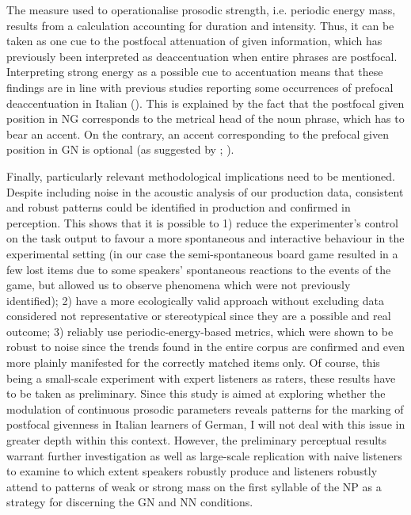 The measure used to operationalise prosodic strength, i.e. periodic energy mass, results from a calculation accounting for duration and intensity. Thus, it can be taken as one cue to the postfocal attenuation of given information, which has previously been interpreted as deaccentuation when entire phrases are postfocal. Interpreting strong energy as a possible cue to accentuation means that these findings are in line with previous studies reporting some occurrences of prefocal deaccentuation in Italian (\citealt{AvesaniEtAl2015}). This is explained by the fact that the postfocal given position in NG corresponds to the metrical head of the noun phrase, which has to bear an accent. On the contrary, an accent corresponding to the prefocal given position in GN is optional (as suggested by \citealt{AvesaniEtAl2015}; \citealt{BocciAvesani2011}).

Finally, particularly relevant methodological implications need to be mentioned. Despite including noise in the acoustic analysis of our production data, consistent and robust patterns could be identified in production and confirmed in perception. This shows that it is possible to 1) reduce the experimenter’s control on the task output to favour a more spontaneous and interactive behaviour in the experimental setting (in our case the semi-spontaneous board game resulted in a few lost items due to some speakers’ spontaneous reactions to the events of the game, but allowed us to observe phenomena which were not previously identified); 2) have a more ecologically valid approach without excluding data considered not representative or stereotypical since they are a possible and real outcome; 3) reliably use periodic-energy-based metrics, which were shown to be robust to noise since the trends found in the entire corpus are confirmed and even more plainly manifested for the correctly matched items only. Of course, this being a small-scale experiment with expert listeners as raters, these results have to be taken as preliminary. Since this study is aimed at exploring whether the modulation of continuous prosodic parameters reveals patterns for the marking of postfocal givenness in Italian learners of German, I will not deal with this issue in greater depth within this context. However, the preliminary perceptual results warrant further investigation as well as large-scale replication with naive listeners to examine to which extent speakers robustly produce and listeners robustly attend to patterns of weak or strong mass on the first syllable of the NP as a strategy for discerning the GN and NN conditions.

